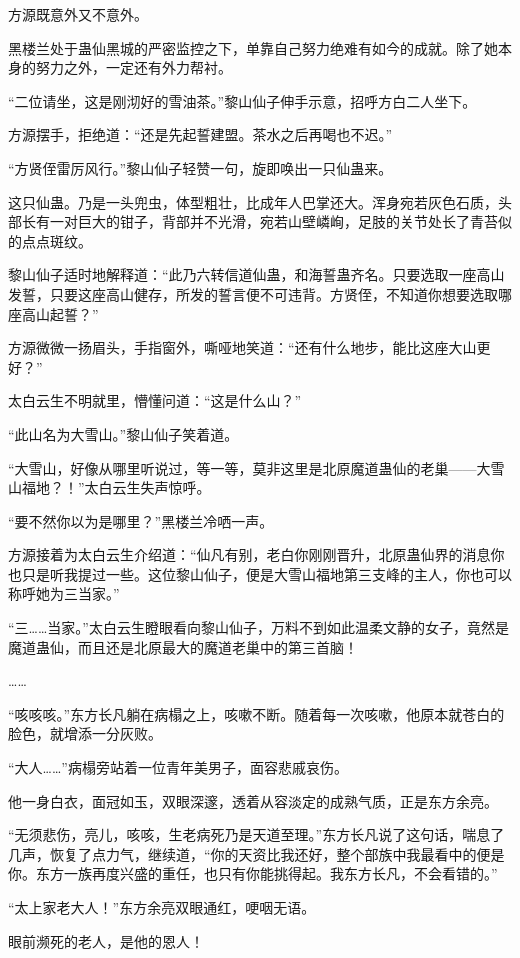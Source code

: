 \begin{this_body}
方源既意外又不意外。

黑楼兰处于蛊仙黑城的严密监控之下，单靠自己努力绝难有如今的成就。除了她本身的努力之外，一定还有外力帮衬。

“二位请坐，这是刚沏好的雪油茶。”黎山仙子伸手示意，招呼方白二人坐下。

方源摆手，拒绝道：“还是先起誓建盟。茶水之后再喝也不迟。”

“方贤侄雷厉风行。”黎山仙子轻赞一句，旋即唤出一只仙蛊来。

这只仙蛊。乃是一头兜虫，体型粗壮，比成年人巴掌还大。浑身宛若灰色石质，头部长有一对巨大的钳子，背部并不光滑，宛若山壁嶙峋，足肢的关节处长了青苔似的点点斑纹。

黎山仙子适时地解释道：“此乃六转信道仙蛊，和海誓蛊齐名。只要选取一座高山发誓，只要这座高山健存，所发的誓言便不可违背。方贤侄，不知道你想要选取哪座高山起誓？”

方源微微一扬眉头，手指窗外，嘶哑地笑道：“还有什么地步，能比这座大山更好？”

太白云生不明就里，懵懂问道：“这是什么山？”

“此山名为大雪山。”黎山仙子笑着道。

“大雪山，好像从哪里听说过，等一等，莫非这里是北原魔道蛊仙的老巢——大雪山福地？！”太白云生失声惊呼。

“要不然你以为是哪里？”黑楼兰冷哂一声。

方源接着为太白云生介绍道：“仙凡有别，老白你刚刚晋升，北原蛊仙界的消息你也只是听我提过一些。这位黎山仙子，便是大雪山福地第三支峰的主人，你也可以称呼她为三当家。”

“三……当家。”太白云生瞪眼看向黎山仙子，万料不到如此温柔文静的女子，竟然是魔道蛊仙，而且还是北原最大的魔道老巢中的第三首脑！

……

“咳咳咳。”东方长凡躺在病榻之上，咳嗽不断。随着每一次咳嗽，他原本就苍白的脸色，就增添一分灰败。

“大人……”病榻旁站着一位青年美男子，面容悲戚哀伤。

他一身白衣，面冠如玉，双眼深邃，透着从容淡定的成熟气质，正是东方余亮。

“无须悲伤，亮儿，咳咳，生老病死乃是天道至理。”东方长凡说了这句话，喘息了几声，恢复了点力气，继续道，“你的天资比我还好，整个部族中我最看中的便是你。东方一族再度兴盛的重任，也只有你能挑得起。我东方长凡，不会看错的。”

“太上家老大人！”东方余亮双眼通红，哽咽无语。

眼前濒死的老人，是他的恩人！


\end{this_body}
